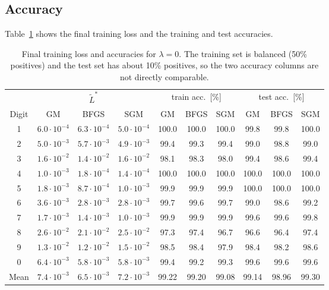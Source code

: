 \documentclass{article}
\begin{document}
\subsection{Accuracy}\label{sec:acc}
Table~\ref{tab:acc} shows the final training loss and the training and test accuracies.

\begin{table}[h]
\centering
\small
\setlength{\tabcolsep}{4pt}
\begin{tabular}{c ccc ccc ccc}
\toprule
 & \multicolumn{3}{c}{$\tilde L^*$} & \multicolumn{3}{c}{train acc.\ [\%]} & \multicolumn{3}{c}{test acc.\ [\%]} \\
\cmidrule(lr){2-4}\cmidrule(lr){5-7}\cmidrule(lr){8-10}
Digit & GM & BFGS & SGM & GM & BFGS & SGM & GM & BFGS & SGM \\
\midrule
1 & $6.0\!\cdot\!10^{-4}$ & $6.3\!\cdot\!10^{-4}$ & $5.0\!\cdot\!10^{-4}$ & 100.0 & 100.0 & 100.0 & 99.8 & 99.8 & 100.0 \\
2 & $5.0\!\cdot\!10^{-3}$ & $5.7\!\cdot\!10^{-3}$ & $4.9\!\cdot\!10^{-3}$ & 99.4 & 99.3 & 99.4 & 99.0 & 98.8 & 99.0 \\
3 & $1.6\!\cdot\!10^{-2}$ & $1.4\!\cdot\!10^{-2}$ & $1.6\!\cdot\!10^{-2}$ & 98.1 & 98.3 & 98.0 & 99.4 & 98.6 & 99.4 \\
4 & $1.0\!\cdot\!10^{-3}$ & $1.8\!\cdot\!10^{-4}$ & $1.4\!\cdot\!10^{-4}$ & 100.0 & 100.0 & 100.0 & 100.0 & 100.0 & 100.0 \\
5 & $1.8\!\cdot\!10^{-3}$ & $8.7\!\cdot\!10^{-4}$ & $1.0\!\cdot\!10^{-3}$ & 99.9 & 99.9 & 99.9 & 100.0 & 100.0 & 100.0 \\
6 & $3.6\!\cdot\!10^{-3}$ & $2.8\!\cdot\!10^{-3}$ & $2.8\!\cdot\!10^{-3}$ & 99.7 & 99.6 & 99.7 & 99.0 & 98.6 & 99.2 \\
7 & $1.7\!\cdot\!10^{-3}$ & $1.4\!\cdot\!10^{-3}$ & $1.0\!\cdot\!10^{-3}$ & 99.9 & 99.9 & 99.9 & 99.6 & 99.6 & 99.8 \\
8 & $2.6\!\cdot\!10^{-2}$ & $2.1\!\cdot\!10^{-2}$ & $2.5\!\cdot\!10^{-2}$ & 97.3 & 97.4 & 96.7 & 96.6 & 96.4 & 97.4 \\
9 & $1.3\!\cdot\!10^{-2}$ & $1.2\!\cdot\!10^{-2}$ & $1.5\!\cdot\!10^{-2}$ & 98.5 & 98.4 & 97.9 & 98.4 & 98.2 & 98.6 \\
0 & $6.4\!\cdot\!10^{-3}$ & $5.8\!\cdot\!10^{-3}$ & $5.8\!\cdot\!10^{-3}$ & 99.4 & 99.2 & 99.3 & 99.6 & 99.6 & 99.6 \\
\midrule
Mean & $7.4\!\cdot\!10^{-3}$ & $6.5\!\cdot\!10^{-3}$ & $7.2\!\cdot\!10^{-3}$ & 99.22 & 99.20 & 99.08 & 99.14 & 98.96 & 99.30 \\
\bottomrule
\end{tabular}
\caption{Final training loss and accuracies for $\lambda=0$. The training set is balanced (50\% positives) and the test set has about 10\% positives, so the two accuracy columns are not directly comparable.}
\label{tab:acc}
\end{table}
\end{document}
